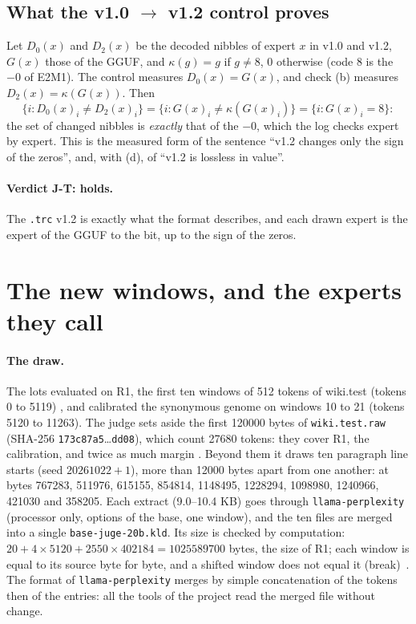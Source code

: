 \subsection{What the v1.0 \texorpdfstring{$\to$}{->} v1.2 control proves}\label{t3jug:sec:temoin}

Let $D_0(x)$ and $D_2(x)$ be the decoded nibbles of expert $x$ in v1.0 and v1.2, $G(x)$ those of the GGUF, and $\kappa(g) = g$ if $g \ne 8$, $0$ otherwise (code 8 is the $-0$ of E2M1). The control measures $D_0(x) = G(x)$, and check (b) measures $D_2(x) = \kappa(G(x))$. Then
\[
\{ i : D_0(x)_i \ne D_2(x)_i \} = \{ i : G(x)_i \ne \kappa(G(x)_i) \} = \{ i : G(x)_i = 8 \}:
\]
the set of changed nibbles is \emph{exactly} that of the $-0$, which the log checks expert by expert. This is the measured form of the sentence ``v1.2 changes only the sign of the zeros'', and, with (d), of ``v1.2 is lossless in value''.

\paragraph{Verdict J-T: holds.} The \texttt{.trc} v1.2 is exactly what the format describes, and each drawn expert is the expert of the GGUF to the bit, up to the sign of the zeros.

\section{The new windows, and the experts they call}\label{t3jug:sec:fenetres}

\paragraph{The draw.} The lots evaluated on R1, the first ten windows of 512 tokens of wiki.test (tokens 0 to \num{5119}) \parencite{merity2016wikitext}, and calibrated the synonymous genome on windows 10 to 21 (tokens \num{5120} to \num{11263}). The judge sets aside the first \num{120000} bytes of \texttt{wiki.test.raw} (SHA-256 \texttt{173c87a5}…\texttt{dd08}), which count \num{27680} tokens: they cover R1, the calibration, and twice as much margin \mes. Beyond them it draws ten paragraph line starts (seed $\num{20261022} + 1$), more than \num{12000} bytes apart from one another: at bytes \num{767283}, \num{511976}, \num{615155}, \num{854814}, \num{1148495}, \num{1228294}, \num{1098980}, \num{1240966}, \num{421030} and \num{358205}. Each extract (\numrange{9.0}{10.4} KB) goes through \texttt{llama-perplexity} (processor only, options of the base, one window), and the ten files are merged into a single \texttt{base-juge-20b.kld}. Its size is checked by computation: $20 + 4 \times \num{5120} + \num{2550} \times \num{402184} = \num{1025589700}$ bytes, the size of R1; each window is equal to its source byte for byte, and a shifted window does not equal it (break) \mes\,\calc. The format of \texttt{llama-perplexity} merges by simple concatenation of the tokens then of the entries: all the tools of the project read the merged file without change.

